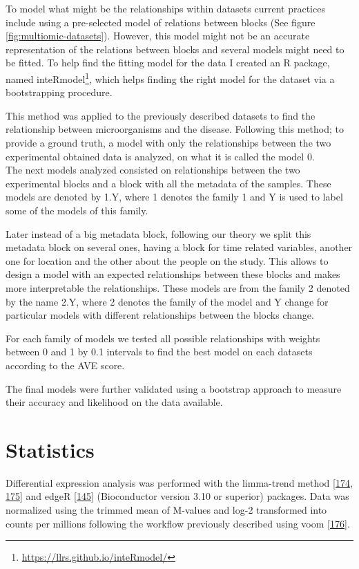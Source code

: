 \documentclass[
  a4paper,
]{book}
\DeclareRobustCommand{\href}[2]{#2\footnote{\url{#1}}}
\begin{document}
To model what might be the relationships within datasets current practices include using a pre-selected model of relations between blocks (See figure \ref{fig:multiomic-datasets}).
However, this model might not be an accurate representation of the relations between blocks and several models might need to be fitted.
To help find the fitting model for the data I created an R package, named \href{https://llrs.github.io/inteRmodel/}{inteRmodel}, which helps finding the right model for the dataset via a bootstrapping procedure.

This method was applied to the previously described datasets to find the relationship between microorganisms and the disease.
Following this method; to provide a ground truth, a model with only the relationships between the two experimental obtained data is analyzed, on what it is called the model 0.\\
The next models analyzed consisted on relationships between the two experimental blocks and a block with all the metadata of the samples.
These models are denoted by 1.Y, where 1 denotes the family 1 and Y is used to label some of the models of this family.

Later instead of a big metadata block, following our theory we split this metadata block on several ones, having a block for time related variables, another one for location and the other about the people on the study.
This allows to design a model with an expected relationships between these blocks and makes more interpretable the relationships.
These models are from the family 2 denoted by the name 2.Y, where 2 denotes the family of the model and Y change for particular models with different relationships between the blocks change.

For each family of models we tested all possible relationships with weights between 0 and 1 by 0.1 intervals to find the best model on each datasets according to the AVE score.

The final models were further validated using a bootstrap approach to measure their accuracy and likelihood on the data available.

\hypertarget{statistics}{%
\section{Statistics}\label{statistics}}

Differential expression analysis was performed with the limma-trend method {[}\protect\hyperlink{ref-ritchie2015}{174}, \protect\hyperlink{ref-law2014}{175}{]} and edgeR {[}\protect\hyperlink{ref-mccarthy2012}{145}{]} (Bioconductor version 3.10 or superior) packages.
Data was normalized using the trimmed mean of M-values and log-2 transformed into counts per millions following the workflow previously described using voom {[}\protect\hyperlink{ref-law2018}{176}{]}.
\end{document}
